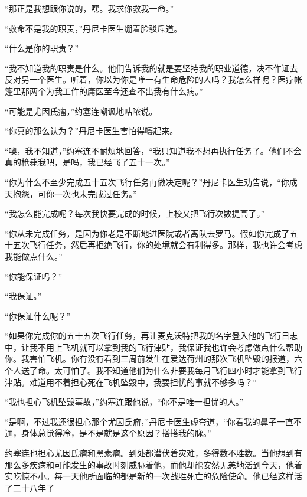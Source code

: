    “那正是我想跟你说的，嘿。我求你救我一命。”

    “救命不是我的职责，”丹尼卡医生绷着脸驳斥道。

    “什么是你的职责？”

    “我不知道我的职责是什么。他们告诉我的就是要坚持我的职业道德，决不作证去反对另一个医生。听着，你以为你是唯一有生命危险的人吗？我怎么样呢？医疗帐篷里那两个为我工作的庸医至今还查不出我有什么病。”

    “可能是尤因氏瘤，”约塞连嘲讽地咕哝说。

    “你真的那么认为？”丹尼卡医生害怕得嚷起来。

    “噢，我不知道，”约塞连不耐烦地回答，“我只知道我不想再执行任务了。他们不会真的枪毙我吧，是吗，我已经飞了五十一次。”

    “你为什么不至少完成五十五次飞行任务再做决定呢？”丹尼卡医生劝告说，“你成天抱怨，可你一次也未完成过任务。”

    “我怎么能完成呢？每次我快要完成的时候，上校又把飞行次数提高了。”

    “你从未完成任务，是因为你老是不断地进医院或者离队去罗马。假如你完成了五十五次飞行任务，然后再拒绝飞行，你的处境就会有利得多。那样，我也许会考虑我能做点什么。”

    “你能保证吗？”

    “我保证。”

    “你保证什么呢？”

    “如果你完成你的五十五次飞行任务，再让麦克沃特把我的名字登入他的飞行日志中，让我不用上飞机就可以拿到我的飞行津贴，我保证我也许会考虑做点什么帮助你。我害怕飞机。你有没有看到三周前发生在爱达荷州的那次飞机坠毁的报道，六个人送了命。太可怕了。我不知道他们为什么非要我每月飞行四小时才能拿到飞行津贴。难道用不着担心死在飞机坠毁中，我要担忧的事就不够多吗？”

    “我也担心飞机坠毁事故，”约塞连跟他说，“你不是唯一担忧的人。”

    “是啊，不过我还很担心那个尤因氏瘤，”丹尼卡医生虚夸道，“你看我的鼻子一直不通，身体总觉得冷，是不是就是这个原因？搭搭我的脉。”

    约塞连也担心尤因氏瘤和黑素瘤。到处都潜伏着灾难，多得数不胜数。当他想到有那么多疾病和可能发生的事故时刻威胁着他，而他却能安然无恙地活到今天，他着实吃惊不小。每一天他所面临的都是新的一次战胜死亡的危险使命。他已经这样活了二十八年了
